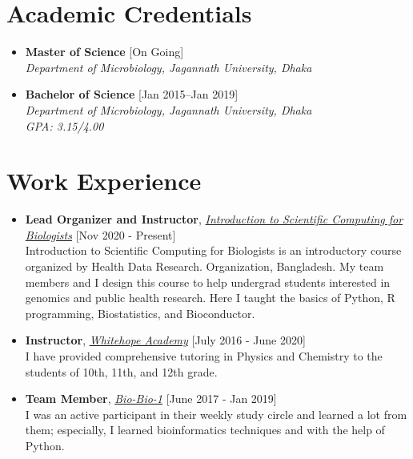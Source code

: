 \documentclass[11pt,a4paper]{moderncv}
\begin{document}
\hskip-2.5cm\makecvtitle
\section{Academic Credentials}
\begin{itemize}
\item \textbf{Master of Science} \hfill [On Going]\\
\textit{Department of Microbiology, Jagannath University, Dhaka}
\item \textbf{Bachelor of Science} \hfill [Jan 2015--Jan 2019]\\
\textit{Department of Microbiology, Jagannath University, Dhaka\\ GPA: 
3.15/4.00}
\end{itemize}

\section{Work Experience}
\begin{itemize}
	\item \textbf{Lead Organizer and Instructor}, 
	\textit{\href{https://scicomforbio.github.io/}{Introduction to Scientific 
	Computing for Biologists}} \hfil[Nov 2020 - Present] \\
	Introduction to Scientific Computing for Biologists is an introductory 
	course organized by Health Data Research.
	Organization, Bangladesh. My team members and I design this course to help 
	undergrad students interested in genomics and
	public health research. Here I taught the basics of Python, R programming, 
	Biostatistics, and Bioconductor.
	\item \textbf{Instructor}, 
	\textit{\href{https://scicomforbio.github.io/}{Whitehope Academy}} 
	\hfil[July 2016 - June 2020] \\ 
	I have provided comprehensive tutoring in Physics and Chemistry to the 
	students of 10th, 11th, and 12th grade.
	\item \textbf{Team Member}, 
	\textit{\href{}{Bio-Bio-1}} \hfil[June 2017 - Jan 2019]\\ 
	I was an active participant in their weekly study circle and learned a lot 
	from them; especially, I learned bioinformatics techniques and with the 
	help of Python. 
\end{itemize}
\end{document}
